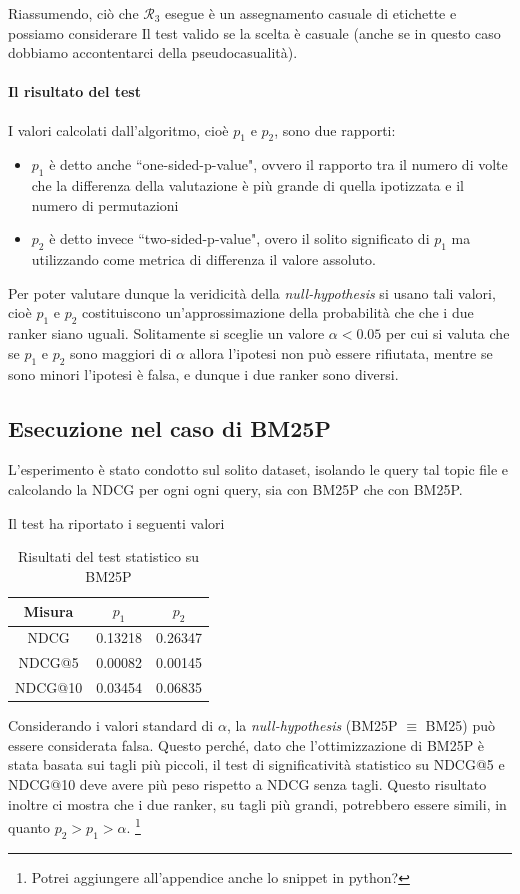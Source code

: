 Riassumendo, ciò che $\mathcal{R}_3$ esegue è un assegnamento casuale di etichette e
possiamo considerare Il test valido se la scelta è casuale (anche se in questo caso
dobbiamo accontentarci della pseudocasualità).

\paragraph{Il risultato del test}
I valori calcolati dall'algoritmo, cioè $p_1$ e $p_2$, sono due rapporti:

\begin{itemize}
	\item $p_1$ è detto anche ``one-sided-p-value", ovvero il rapporto tra il numero di volte che la differenza
	della valutazione è più grande di quella ipotizzata e il numero di permutazioni
	\item $p_2$ è detto invece ``two-sided-p-value", overo il solito significato di $p_1$ ma utilizzando
	come metrica di differenza il valore assoluto.
\end{itemize}


Per poter valutare dunque la veridicità della \textit{null-hypothesis} si usano tali valori,
cioè $p_1$ e $p_2$ costituiscono un'approssimazione della probabilità che che i due ranker
siano uguali. Solitamente si sceglie un valore $\alpha < 0.05$ per cui si valuta che
se $p_1$ e $p_2$ sono maggiori di $\alpha$ allora l'ipotesi non può essere rifiutata,
mentre se sono minori l'ipotesi è falsa, e dunque i due ranker sono diversi.


\subsection{Esecuzione nel caso di BM25P}
L'esperimento è stato condotto sul solito dataset, isolando le query tal topic file e calcolando la NDCG
per ogni ogni query, sia con BM25P che con BM25P.

Il test ha riportato i seguenti valori

\begin{table}[h!]
	\centering
	\begin{tabular}{|c|c|c|}
		\hline
		\textbf{Misura} & $p_1$ & $p_2$ \\
		\hline
		NDCG  & 0.13218 & 0.26347 \\
		\hline
		NDCG@5 & 0.00082 & 0.00145 \\
		\hline
		NDCG@10 & 0.03454 & 0.06835 \\
		\hline
	\end{tabular}
	\caption{Risultati del test statistico su BM25P}
\end{table}

Considerando i valori standard di $\alpha$, la \textit{null-hypothesis} (BM25P $\equiv$ BM25) può essere considerata falsa.
Questo perché, dato che l'ottimizzazione di BM25P è stata basata sui tagli più piccoli, il test di significatività statistico su NDCG@5 e NDCG@10 
deve avere più peso rispetto a NDCG senza tagli.
Questo risultato inoltre ci mostra che i due ranker, su tagli più grandi, potrebbero essere simili, in quanto $p_2 > p_1 > \alpha$. \footnote{Potrei aggiungere all'appendice anche lo snippet in python?}

